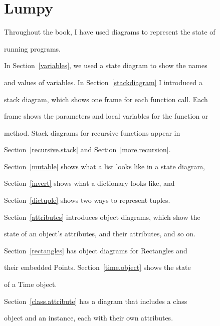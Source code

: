 \chapter{Lumpy}

\label{lumpy}



Throughout the book, I have used diagrams to represent the state of

running programs.




In Section~\ref{variables}, we used a state diagram to show the names

and values of variables.  In Section~\ref{stackdiagram} I introduced a

stack diagram, which shows one frame for each function call.  Each

frame shows the parameters and local variables for the function or

method.  Stack diagrams for recursive functions appear in

Section~\ref{recursive.stack} and Section~\ref{more.recursion}.

 

 



Section~\ref{mutable} shows what a list looks like in a state diagram,

Section~\ref{invert} shows what a dictionary looks like, and

Section~\ref{dictuple} shows two ways to represent tuples.



Section~\ref{attributes} introduces object diagrams, which show the

state of an object's attributes, and their attributes, and so on.

Section~\ref{rectangles} has object diagrams for Rectangles and

their embedded Points.  Section~\ref{time.object} shows the state

of a Time object.

Section~\ref{class.attribute} has a diagram that includes a class

object and an instance, each with their own attributes.






